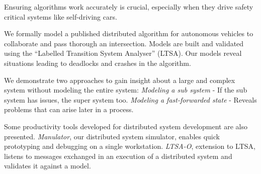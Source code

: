 \par
Ensuring algorithms work accurately is crucial, especially when they drive safety critical systems like self-driving cars.

\par
We formally model a published distributed algorithm for autonomous vehicles to collaborate and pass thorough an intersection. Models are built and validated using the ``Labelled Transition System Analyser'' (LTSA). Our models reveal situations leading to deadlocks and crashes in the algorithm.

\par
We demonstrate two approaches to gain insight about a large and complex system without modeling the entire system: \textit{Modeling a sub system} - If the sub system has issues, the super system too. \textit{Modeling a fast-forwarded state} - Reveals problems that can arise later in a process.

\par
Some productivity tools developed for distributed system development are also presented. \textit{Manulator}, our distributed system simulator, enables quick prototyping and debugging on a single workstation. \textit{LTSA-O}, extension to LTSA, listens to messages exchanged in an execution of a distributed system and validates it against a model.







 

